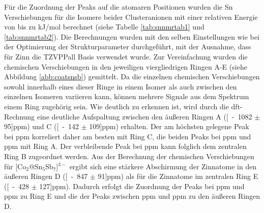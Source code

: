 Für die Zuordnung der Peaks auf die atomaren Positionen wurden die Sn Verschiebungen für die Isomere beider Clusteranionen mit einer relativen Energie von bis zu \unit[10]{kJ/mol} berechnet (siehe Tabelle \ref{tab:snnmrtab1} und \ref{tab:snnmrtab2}). Die Berechnungen wurden mit den selben Einstellungen wie bei der Optimierung der Strukturparameter durchgeführt, mit der Ausnahme, dass für Zinn die TZVPPall Basis\supercite{ahlrichs2000contracted} verwendet wurde. Zur Vereinfachung wurden die chemischen Verschiebungen in den jeweiligen viergliedrigen Ringen A-E (siehe Abbildung \ref{abb:coatsnsb}) gemittelt. Da die einzelnen chemischen Verschiebungen sowohl innerhalb eines dieser Ringe in einem Isomer als auch zwischen den einzelnen Isomeren variieren kann, können mehrere Signale aus dem Spektrum einem Ring zugehörig sein. Wie deutlich zu erkennen ist, wird durch die \ac{dft}-Rechnung eine deutliche Aufspaltung zwischen den äußeren Ringen A (\unit[-1082 $\pm$ 95]{ppm}) und C (\unit[-142 $\pm$ 109]{ppm}) erhalten. Der am höchsten gelegene Peak bei \unit[-119]{ppm} korreliert daher am besten mit Ring C, die beiden Peaks bei \unit[-970]{ppm} und \unit[-1018]{ppm} mit Ring A. Der verbleibende Peak bei \unit[-731]{ppm} kann folglich dem zentralen Ring B zugeordnet werden. Aus der Berechnung der chemischen Verschiebungen für [Co$_2$@Sn$_5$Sb$_7$]$^{3-}$ ergibt sich eine stärkere Abschirmung der Zinnatome in den äußeren Ringen D (\unit[-847 $\pm$ 91]{ppm}) als für die Zinnatome im zentralen Ring E (\unit[-428 $\pm$ 127]{ppm}). Dadurch erfolgt die Zuordnung der Peaks bei \unit[-634]{ppm} und \unit[-676]{ppm} zu Ring E und die der Peaks zwischen \unit[-849]{ppm} und \unit[-890]{ppm} zu den äußeren Ringen D. 

